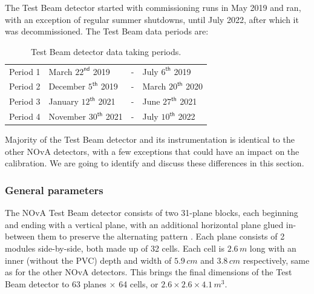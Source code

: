 \documentclass[12pt,a4paper]{article}
\begin{document}

The Test Beam detector started with commissioning runs in May 2019 and ran, with an exception of regular summer shutdowns, until July 2022, after which it was decommissioned. The Test Beam data periods are:
\begin{table}[!ht]
\centering
\def\arraystretch{1.4}
\begin{tabular}{l@{\hskip 1in}lcl}
Period 1 & March $22^{\textsf{nd}}$ 2019 & - & July $6^{\textsf{th}}$ 2019\\
Period 2 & December $5^{\textsf{th}}$ 2019 & - & March $20^{\textsf{th}}$ 2020\\
Period 3 & January $12^{\textsf{th}}$ 2021 & - & June $27^{\textsf{th}}$ 2021\\
Period 4 & November $30^{\textsf{th}}$ 2021 & - & July $10^{\textsf{th}}$ 2022
\end{tabular}
\caption{Test Beam detector data taking periods.}
\label{tabTestBeamPeriods}
\end{table}

Majority of the Test Beam detector and its instrumentation is identical to the other NOvA detectors, with a few exceptions that could have an impact on the calibration. We are going to identify and discuss these differences in this section.


\subsubsection*{General parameters}
The NOvA Test Beam detector consists of two 31-plane blocks, each beginning and ending with a vertical plane, with an additional horizontal plane glued in-between them to preserve the alternating pattern \cite{NOVA-doc-29543}. Each plane consists of 2 modules side-by-side, both made up of 32 cells. Each cell is $2.6\,\unit{m}$ long with an inner (without the PVC) depth and width of $5.9\,\unit{cm}$ and $3.8\,\unit{cm}$ respectively, same as for the other NOvA detectors. This brings the final dimensions of the Test Beam detector to 63 planes $\times$ 64 cells, or $2.6\times 2.6\times 4.1\,\unit{m^3}$.
\end{document}
